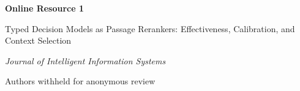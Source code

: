 \documentclass[10pt,a4paper]{article}
\begin{document}
\begin{center}
{\Large\bfseries Online Resource 1\par}
\vspace{0.5em}
{\large Typed Decision Models as Passage Rerankers: Effectiveness, Calibration, and Context Selection\par}
\vspace{0.5em}
\textit{Journal of Intelligent Information Systems}\par
\vspace{0.8em}
Authors withheld for anonymous review\par
\end{center}
\suppressfloats[t]





\end{document}
